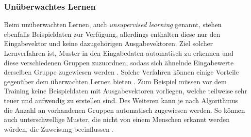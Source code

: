 \subsubsection{Unüberwachtes Lernen}
\label{subsubsec:unsupervised_learning}
Beim unüberwachten Lernen, auch \emph{unsupervised learning} genannt, stehen ebenfalls Beispieldaten zur Verfügung, allerdings enthalten diese nur den Eingabevektor und keine dazugehörigen Ausgabevektoren. Ziel solcher Lernverfahren ist, Muster in den Eingabedaten automatisch zu erkennen und diese verschiedenen Gruppen zuzuordnen, sodass sich ähnelnde Eingabewerte derselben Gruppe zugewiesen werden \cite{zell2003simulation}. Solche Verfahren können einige Vorteile gegenüber dem überwachten Lernen bieten \cite{mahmad2005IEEE}. Zum Beispiel müssen vor dem Training keine Beispieldaten mit Ausgabevektoren vorliegen, welche teilweise sehr teuer und aufwendig zu erstellen sind. Des Weiteren kann je nach Algorithmus die Anzahl an vorhandenen Gruppen automatisch zugewiesen werden. So können auch unterschwellige Muster, die nicht von einem Menschen erkannt werden würden, die Zuweisung beeinflussen \cite{mahmad2005IEEE}.
 
